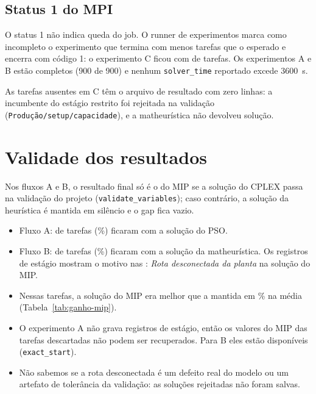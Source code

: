 \documentclass[11pt,a4paper]{article}
\begin{document}
\begin{table}[H]
  \centering
  \small
  \resizebox{\textwidth}{!}{}
  \caption{Resumo da execução. ``Solução final do MIP'' conta as tarefas cujo
  resultado reportado vem do MIP. O tempo é o \texttt{solver\_time} do
  componente que produziu a solução final (no fluxo A, o tempo do PSO quando o MIP
  é descartado); a tarefa inteira usou até 60 minutos.}
  \label{tab:execucao}
\end{table}

\subsection{Status 1 do MPI}

O status 1 não indica queda do job. O runner de experimentos marca como
incompleto o experimento que termina com menos tarefas que o esperado e encerra
com código 1: o experimento C ficou com \nCtasks{} de \nTasks{} tarefas. Os
experimentos A e B estão completos (900 de 900) e nenhum \texttt{solver\_time}
reportado excede 3600~s.

As \nMissingC{} tarefas ausentes em C têm o arquivo de resultado com zero linhas:
a incumbente do estágio restrito foi rejeitada na validação
(\texttt{Produção/setup/capacidade}), e a matheurística não devolveu solução.



\section{Validade dos resultados}
\label{sec:validade}

Nos fluxos A e B, o resultado final só é o do MIP se a solução do CPLEX passa
na validação do projeto (\texttt{validate\_variables}); caso contrário, a solução
da heurística é mantida em silêncio e o gap fica vazio.

\begin{itemize}[leftmargin=*]
  \item Fluxo A: \nAfallback{} de \nTasks{} tarefas (\pctAfallback\%) ficaram com a solução do PSO.
  \item Fluxo B: \nBfallback{} de \nTasks{} tarefas (\pctBfallback\%) ficaram com a solução da
  matheurística. Os registros de estágio mostram o motivo nas \nBfallback{}:
  \emph{Rota desconectada da planta} na solução do MIP.
  \item Nessas tarefas, a solução do MIP era melhor que a mantida em \pctBgainRejected\%
  na média (Tabela~\ref{tab:ganho-mip}).
  \item O experimento A não grava registros de estágio, então os valores do MIP
  das \nAfallback{} tarefas descartadas não podem ser recuperados. Para B eles estão
  disponíveis (\texttt{exact\_start}).
  \item Não sabemos se a rota desconectada é um defeito real do modelo ou um
  artefato de tolerância da validação: as soluções rejeitadas não foram salvas.
\end{itemize}
\end{document}
